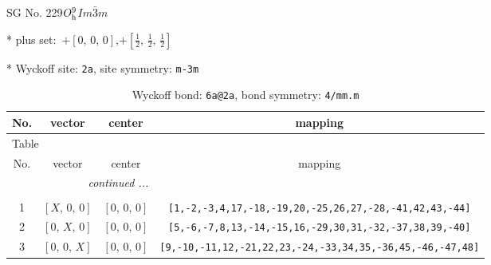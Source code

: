 \documentclass[fleqn,8pt]{jsarticle}
\begin{document}
\setcounter{MaxMatrixCols}{32}

\renewcommand{\tablename}{Table~}
\renewcommand{\figurename}{Figure~}
\begin{center}
\LARGE
SG No. 229\quad$O_{\rm h}^{9}$\quad$Im\bar{3}m$\quad[ cubic ]
\end{center}

* plus set:\,\,\,$+\left[ 0,\, 0,\, 0 \right]$,\quad $+\left[ \frac{1}{2},\, \frac{1}{2},\, \frac{1}{2} \right]$


* Wyckoff site: {\tt 2a}, site symmetry: {\tt m-3m}
\renewcommand{\arraystretch}{1.2}
\begin{longtable}{cccc}
\caption{Wyckoff bond: {\tt 6a@2a}, bond symmetry: {\tt 4/mm.m}}
 \\
 \hline \hline
No. & vector & center & mapping \\ \hline \endfirsthead

\multicolumn{3}{l}{\tablename\ \thetable{}} \\
 \hline \hline
No. & vector & center & mapping \\ \hline \endhead

 \hline \hline
\multicolumn{3}{r}{\footnotesize\it continued ...} \\ \endfoot

 \hline \hline
\multicolumn{3}{r}{} \\ \endlastfoot

1 & $\left[ X,\, 0,\, 0 \right]$ & $\left[ 0,\, 0,\, 0 \right]$ & {\tt [1,-2,-3,4,17,-18,-19,20,-25,26,27,-28,-41,42,43,-44]} \\ \hline
2 & $\left[ 0,\, X,\, 0 \right]$ & $\left[ 0,\, 0,\, 0 \right]$ & {\tt [5,-6,-7,8,13,-14,-15,16,-29,30,31,-32,-37,38,39,-40]} \\ \hline
3 & $\left[ 0,\, 0,\, X \right]$ & $\left[ 0,\, 0,\, 0 \right]$ & {\tt [9,-10,-11,12,-21,22,23,-24,-33,34,35,-36,45,-46,-47,48]} \\
\end{longtable}
\renewcommand{\arraystretch}{1.2}
\end{document}
